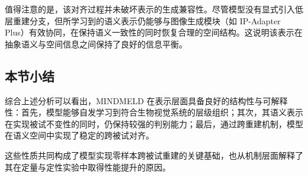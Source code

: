 值得注意的是，该对齐过程并未破坏表示的生成兼容性。尽管模型没有显式引入低层重建分支，但所学习到的语义表示仍能够与图像生成模块（如 IP-Adapter Plus）有效协同，在保持语义一致性的同时恢复合理的空间结构。这说明该表示在抽象语义与空间信息之间保持了良好的信息平衡。

\subsection{本节小结}

综合上述分析可以看出，MINDMELD 在表示层面具备良好的结构性与可解释性：首先，模型能够自发学习到符合生物视觉系统的层级组织；其次，其语义表示在实现被试不变性的同时，仍保持较强的判别能力；最后，通过跨重建机制，模型在语义空间中实现了稳定的跨被试对齐。

这些性质共同构成了模型实现零样本跨被试重建的关键基础，也从机制层面解释了其在定量与定性实验中取得性能提升的原因。


\chapterbib